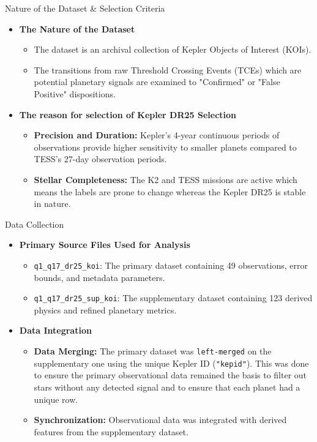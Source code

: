 \documentclass[9pt, aspectratio=169]{beamer}
\begin{document}
\begin{frame}{Nature of the Dataset \& Selection Criteria}
    \begin{itemize}
        \item \textbf{The Nature of the Dataset} 
        \begin{itemize}
            \item The dataset is an archival collection of Kepler Objects of Interest (KOIs).
            \item The transitions from raw Threshold Crossing Events (TCEs) which are potential planetary signals are examined to "Confirmed" or "False Positive" dispositions.
        \end{itemize}
        \vfill
        \item \textbf{The reason for selection of Kepler DR25 Selection}
        \begin{itemize}
            \item \textbf{Precision and Duration:} Kepler’s 4-year continuous periods of observations provide higher sensitivity to smaller planets compared to TESS’s 27-day observation periods.
            \item \textbf{Stellar Completeness:} The K2 and TESS missions are active which means the labels are prone to change whereas the Kepler DR25 is stable in nature.
        \end{itemize}
    \end{itemize}
\end{frame}

\begin{frame}{Data Collection}
    \begin{itemize}
        \item \textbf{Primary Source Files Used for Analysis}
        \begin{itemize}
            \item \texttt{q1\_q17\_dr25\_koi}: The primary dataset containing 49 observations, error bounds, and metadata parameters.
            \item \texttt{q1\_q17\_dr25\_sup\_koi}: The supplementary dataset containing 123 derived physics and refined planetary metrics.
        \end{itemize}
        \vfill
        \item \textbf{Data Integration}
        \begin{itemize}
            \item \textbf{Data Merging:} The primary dataset was \texttt{left-merged} on the supplementary one using the unique Kepler ID (\texttt{"kepid"}). This was done to ensure the primary observational data remained the basis to filter out stars without any detected signal and to ensure that each planet had a unique row.
            \item \textbf{Synchronization:} Observational data was integrated with derived features from the supplementary dataset.
        \end{itemize}
    \end{itemize}
\end{frame}
\end{document}
